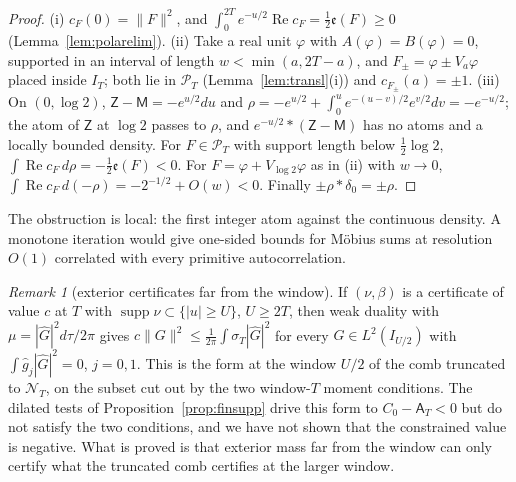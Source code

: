 \documentclass[11pt]{amsart}
\theoremstyle{definition}
\theoremstyle{remark}
\newtheorem{remark}[theorem]{Remark}
\newcommand{\Rel}{\operatorname{Re}}
\newcommand{\supp}{\operatorname{supp}}
\newcommand{\PT}{\mathcal P_T}
\newcommand{\IT}{I_T}
\newcommand{\sT}{\sigma_T}
\newcommand{\gh}[1]{\widehat g_{#1}}
\newcommand{\cF}{c_F}
\newcommand{\NT}{\mathcal N_T}
\newcommand{\Aconst}{\mathsf A_T}
\begin{document}
\begin{proof}
(i) $c_F(0)=\|F\|^2$, and $\int_0^{2T}e^{-u/2}\Rel\cF=\frac12\mathfrak e(F)\ge0$ (Lemma~\ref{lem:polarelim}). (ii) Take a real unit $\varphi$ with $A(\varphi)=B(\varphi)=0$,
supported in an interval of length $w<\min(a,2T-a)$, and $F_\pm=\varphi\pm V_a\varphi$ placed inside $\IT$; both lie in $\PT$
(Lemma~\ref{lem:transl}(i)) and $c_{F_\pm}(a)=\pm1$. (iii) On $(0,\log2)$, $\mathsf Z-\mathsf M=-e^{u/2}du$ and
$\rho=-e^{u/2}+\int_0^ue^{-(u-v)/2}e^{v/2}dv=-e^{-u/2}$; the atom of $\mathsf Z$ at $\log2$ passes to $\rho$, and $e^{-u/2}*(\mathsf Z-\mathsf M)$ has no
atoms and a locally bounded density. For $F\in\PT$ with support length below $\frac12\log2$, $\int\Rel\cF\,d\rho=-\frac12\mathfrak e(F)<0$. For
$F=\varphi+V_{\log2}\varphi$ as in (ii) with $w\to0$, $\int\Rel\cF\,d(-\rho)=-2^{-1/2}+O(w)<0$. Finally $\pm\rho*\delta_0=\pm\rho$.
\end{proof}

The obstruction is local: the first integer atom against the continuous density. A monotone iteration would give one-sided
bounds for M\"obius sums at resolution $O(1)$ correlated with every primitive autocorrelation.

\begin{remark}[exterior certificates far from the window]\label{rem:farext}
If $(\nu,\beta)$ is a certificate of value $c$ at $T$ with $\supp\nu\subset\{|u|\ge U\}$, $U\ge2T$, then weak duality with
$\mu=|\widehat G|^2d\tau/2\pi$ gives $c\|G\|^2\le\frac1{2\pi}\int\sT|\widehat G|^2$ for every $G\in L^2(I_{U/2})$ with $\int\gh j|\widehat G|^2=0$, $j=0,1$.
This is the form at the window $U/2$ of the comb truncated to $\NT$, on the subset cut out by the two window-$T$ moment conditions.
The dilated tests of Proposition~\ref{prop:finsupp} drive this form to $C_0-\Aconst<0$ but do not satisfy the two conditions,
and we have not shown that the constrained value is negative. What is proved is that exterior mass far from the window can only
certify what the truncated comb certifies at the larger window.
\end{remark}
\end{document}

